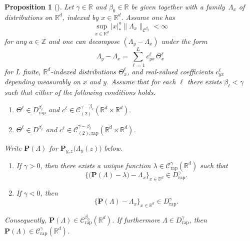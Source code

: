 \documentclass[11pt]{article}
\numberwithin{equation}{section}
\newenvironment{enumeratei}
{\bgroup\def\theenumi{\roman{enumi}}\def\theenumii{\arabic{enumii}}\begin{enumerate}}
{\end{enumerate}\egroup}
\newenvironment{enumeratea}
{\bgroup\def\theenumi{\alph{enumi}}\begin{enumerate}}
{\end{enumerate}\egroup}
\theoremstyle{plain}
\newtheorem{prop}[thm]{Proposition}
\theoremstyle{definition}
\newcommand{\rap}{\mathrm{rap}}
\newcommand{\bfP}{\mathbf{P}}
\newcommand{\bbR}{\mathbb{R}}
\newcommand{\bbZ}{\mathbb{Z}}
\newcommand{\mcC}{\mathcal{C}}
\begin{document}
\begin{prop}[{\cite[Prop.\,9]{BH}}] \label{prop:reconstruction}
Let $\gamma\!\in\!\bbR$ and $\beta_0\!\in\!\bbR$ be given together with a fam\-ily~$\Lambda_x$ of distributions on $\bbR^d$, indexed by $x\in\bbR^d$. Assume one has
\[
\sup_{x\in\bbR^d}|x|_*^a\|\Lambda_x\|_{\mcC^{\beta_0}}< \infty
\]
for any $a\in\bbZ$ and one can decompose $(\Lambda_y - \Lambda_x)$ under the form
\begin{equation*}
\Lambda_y - \Lambda_x = \sum_{\ell=1}^L c^\ell_{yx}\,\Theta_x^\ell
\end{equation*}
for $L$ finite, $\bbR^d$-indexed distributions $\Theta_x^\ell$, and real-valued coefficients $c_{yx}^\ell$ depending measurably on $x$ and $y$.
Assume that for each $\ell$ there exists $\beta_\ell<\gamma$ such that either of the following conditions holds.
\begin{enumeratea}
\item\label{prop:reconstructiona} $\Theta^\ell\in D_{\rap}^{\beta_\ell}$ and $c^\ell\in\mcC_{(2)}^{\gamma-\beta_\ell}(\bbR^d\times\bbR^d)$.
\item\label{prop:reconstructionb} $\Theta^\ell\in D^{\beta_\ell}$ and $c^\ell\in\mcC_{(2),\rap}^{\gamma-\beta_\ell}(\bbR^d\times\bbR^d)$.
\end{enumeratea}

\noindent Write ${\bfP}(\Lambda)$ for ${\bfP}_{y,z}\bigl(\Lambda_y(z)\bigr)$ below.

\begin{enumeratei}
\item If $\gamma>0$, then there exists a unique function $\lambda\in \mcC_{\rap}^\gamma(\bbR^d)$ such that
\[
\big\{\bigl(\bfP(\Lambda)-\lambda\bigr) - \Lambda_x\big\}_{x\in\bbR^d}\in D_\rap^\gamma.
\]
\item If $\gamma<0$, then
\[
\big\{\bfP(\Lambda)-\Lambda_x\big\}_{x\in\bbR^d}\in D_\rap^\gamma.
\]
\end{enumeratei}
Consequently, $\bfP(\Lambda)\in \mcC_\rap^{\beta_0}(\bbR^d)$. If furthermore $\Lambda\in D_\rap^\gamma$, then $\bfP(\Lambda)\in \mcC_\rap^\gamma(\bbR^d)$.
\end{prop}
\end{document}
